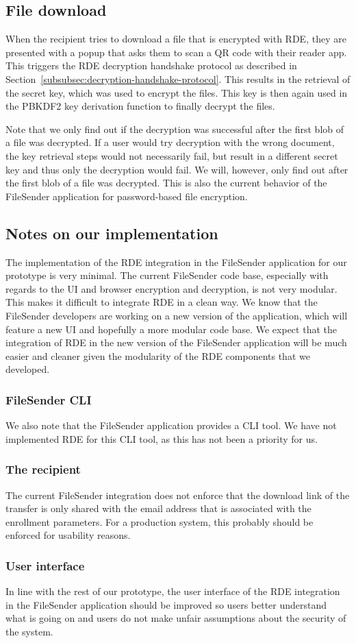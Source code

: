 \subsection{File download}\label{subsec:file-download}
When the recipient tries to download a file that is encrypted with RDE, they are presented with a popup that asks them to scan a QR code with their reader app.
This triggers the RDE decryption handshake protocol as described in Section~\ref{subsubsec:decryption-handshake-protocol}.
This results in the retrieval of the secret key, which was used to encrypt the files.
This key is then again used in the PBKDF2 key derivation function to finally decrypt the files.

Note that we only find out if the decryption was successful after the first blob of a file was decrypted.
If a user would try decryption with the wrong document, the key retrieval steps would not necessarily fail, but result in a different secret key and thus only the decryption would fail.
We will, however, only find out after the first blob of a file was decrypted.
This is also the current behavior of the FileSender application for password-based file encryption.

\subsection{Notes on our implementation}\label{subsec:notes-on-our-implementation}
The implementation of the RDE integration in the FileSender application for our prototype is very minimal.
The current FileSender code base, especially with regards to the UI and browser encryption and decryption, is not very modular.
This makes it difficult to integrate RDE in a clean way.
We know that the FileSender developers are working on a new version of the application, which will feature a new UI and hopefully a more modular code base.
We expect that the integration of RDE in the new version of the FileSender application will be much easier and cleaner given the modularity of the RDE components that we developed.

\subsubsection{FileSender CLI}
We also note that the FileSender application provides a CLI tool.
We have not implemented RDE for this CLI tool, as this has not been a priority for us.

\subsubsection{The recipient}
The current FileSender integration does not enforce that the download link of the transfer is only shared with the email address that is associated with the enrollment parameters.
For a production system, this probably should be enforced for usability reasons.

\subsubsection{User interface}
In line with the rest of our prototype, the user interface of the RDE integration in the FileSender application should be improved so users better understand what is going on and users do not make unfair assumptions about the security of the system.

